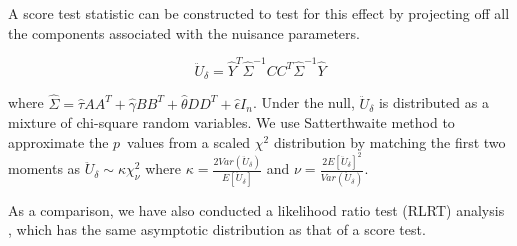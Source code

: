 \documentclass[hidelinks]{article}
\begin{document}
A score test statistic can be constructed to test for this effect by projecting off all the components associated with the nuisance parameters.

\begingroup
\large
\[
\ddot{U}_\delta = \hat{Y}^T \hat{\Sigma}^{-1} CC^T \hat{\Sigma}^{-1} \hat{Y}
\]
\endgroup

where $\hat{\Sigma} = \hat{\tau}AA^T + \hat{\gamma}BB^T + \hat{\theta}DD^T  + \hat{\epsilon}I_n$. Under the null, $\ddot{U}_\delta$ is distributed as a mixture of chi-square random variables. We use Satterthwaite method to approximate the $p$~values from a scaled $\chi^2$ distribution by matching the first two moments as $\ddot{U}_\delta \sim \kappa \chi^2_{\nu}$ where $\kappa = \frac{2 Var(\ddot{U}_\delta)}{E[\ddot{U}_\delta]}$ and $\nu = \frac{2 E[\ddot{U}_\delta]^2}{Var(\ddot{U}_\delta)}$.

As a comparison, we have also conducted a likelihood ratio test (RLRT) analysis \cite{rlrsim}, which has the same asymptotic distribution as that of a score test. 
\end{document}
